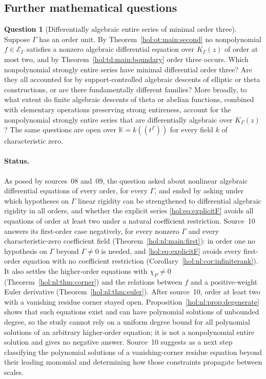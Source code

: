 \documentclass[11pt]{article}
\numberwithin{equation}{section}
\theoremstyle{definition}
\newtheorem{question}[theorem]{Question}
\theoremstyle{remark}
\newcommand{\K}{K_\Gamma}
\newcommand{\E}{\mathcal E_\Gamma}
\newcommand{\KK}{\mathbb K}
\begin{document}
\subsection{Further mathematical questions}

\begin{question}[Differentially algebraic entire series of minimal order
three]\label{hol:q:nonlinear}
Suppose $\Gamma$ has an order unit. By Theorem~\ref{hol:ot:main:second} no
nonpolynomial $f\in\E$ satisfies a nonzero algebraic differential equation
over $\K(z)$ of order at most two, and by Theorem~\ref{hol:td:main:boundary}
order three occurs. Which nonpolynomial strongly entire series have minimal
differential order three? Are they all accounted for by support-controlled
algebraic descents of elliptic or theta constructions, or are there
fundamentally different families? More broadly, to what extent do finite
algebraic descents of theta or abelian functions, combined with elementary
operations preserving strong entireness, account for the nonpolynomial
strongly entire series that are differentially algebraic over $\K(z)$? The
same questions are open over $\KK=k((t^\Gamma))$ for every field $k$ of
characteristic zero.
\end{question}

\paragraph{Status.}
As posed by sources~08 and~09, the question asked about nonlinear algebraic
differential equations of every order, for every $\Gamma$, and ended by
asking under which hypotheses on $\Gamma$ linear rigidity can be strengthened
to differential algebraic rigidity in all orders, and whether the explicit
series \eqref{hol:eq:explicitF} avoids all equations of order at least two
under a natural coefficient restriction. Source~10 answers its first-order case
negatively, for every nonzero $\Gamma$ and every characteristic-zero
coefficient field (Theorem~\ref{hol:nl:main:first}): in order one no
hypothesis on $\Gamma$ beyond $\Gamma\ne0$ is needed, and
\eqref{hol:eq:explicitF} avoids every first-order equation with no
coefficient restriction (Corollary~\ref{hol:nl:cor:infiniterank}). It also
settles the higher-order equations with $\chi_P\ne0$
(Theorem~\ref{hol:nl:thm:corner}) and the relations between $f$ and a
positive-weight Euler derivative (Theorem~\ref{hol:nl:thm:euler}). After
source~10, order at least two with a vanishing residue corner stayed open.
Proposition~\ref{hol:nl:prop:degenerate} shows that such equations exist and
can have polynomial solutions of unbounded degree, so the study cannot rely on
a uniform degree bound for all polynomial solutions of an arbitrary
higher-order equation; it is not a nonpolynomial entire solution and gives no
negative answer. Source~10 suggests as a next step classifying the polynomial
solutions of a vanishing-corner residue equation beyond their leading monomial
and determining how those constraints propagate between scales.
\end{document}
